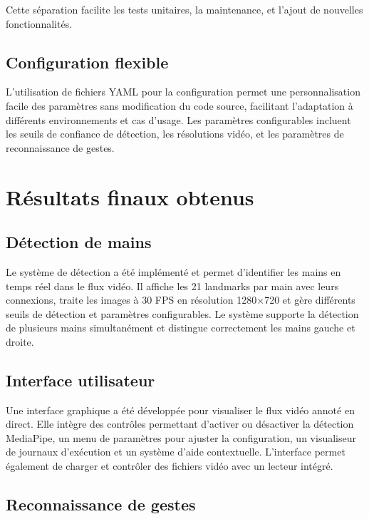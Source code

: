 \documentclass[12pt,a4paper]{article}
\begin{document}
Cette séparation facilite les tests unitaires, la maintenance, et l'ajout de nouvelles fonctionnalités.

\subsection{Configuration flexible}

L'utilisation de fichiers YAML pour la configuration permet une personnalisation facile des paramètres sans modification du code source, facilitant l'adaptation à différents environnements et cas d'usage. Les paramètres configurables incluent les seuils de confiance de détection, les résolutions vidéo, et les paramètres de reconnaissance de gestes.

\section{Résultats finaux obtenus}

\subsection{Détection de mains}

Le système de détection a été implémenté et permet d'identifier les mains en temps réel dans le flux vidéo. Il affiche les 21 landmarks par main avec leurs connexions, traite les images à 30 FPS en résolution 1280×720 et gère différents seuils de détection et paramètres configurables. Le système supporte la détection de plusieurs mains simultanément et distingue correctement les mains gauche et droite.

\subsection{Interface utilisateur}

Une interface graphique a été développée pour visualiser le flux vidéo annoté en direct. Elle intègre des contrôles permettant d'activer ou désactiver la détection MediaPipe, un menu de paramètres pour ajuster la configuration, un visualiseur de journaux d'exécution et un système d'aide contextuelle. L'interface permet également de charger et contrôler des fichiers vidéo avec un lecteur intégré.

\subsection{Reconnaissance de gestes}
\end{document}
